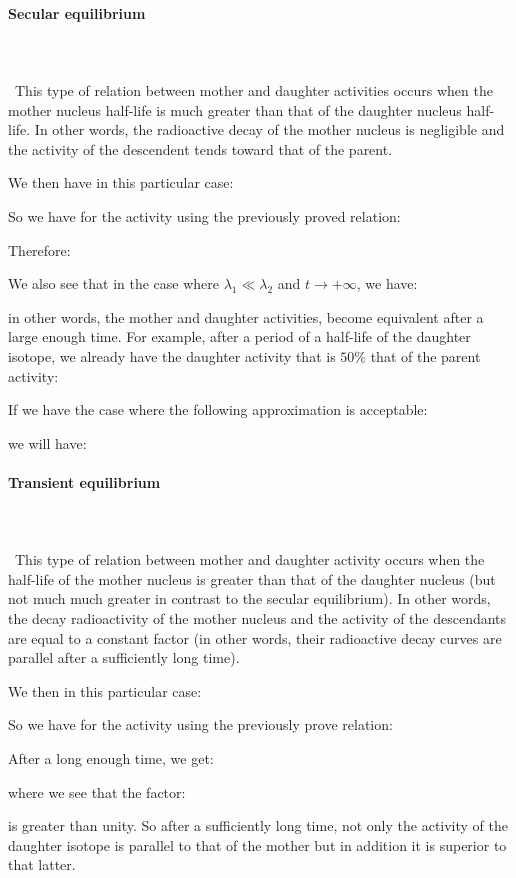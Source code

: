 	\paragraph{Secular equilibrium}\mbox{}\\\\\
	This type of relation between mother and daughter activities occurs when the mother nucleus half-life is much greater than that of the daughter nucleus half-life. In other words, the radioactive decay of the mother nucleus is negligible and the activity of the descendent tends toward that of the parent.

	We then have in this particular case:
	
	So we have for the activity using the previously proved relation:
	
	Therefore:
	
	We also see that in the case where $\lambda_1\ll\lambda_2$ and $t\rightarrow +\infty$, we have:
	
	in other words, the mother and daughter activities, become equivalent after a large enough time. For example, after a period of a half-life of the daughter isotope, we already have the daughter activity that is $50\%$ that of the parent activity:
	
	If we have the case where the following approximation is acceptable:
	
	we will have:
	
	
	\pagebreak
	\paragraph{Transient equilibrium}\mbox{}\\\\\
	This type of relation between mother and daughter activity occurs when the half-life of the mother nucleus is greater than that of the daughter nucleus (but not much much greater in contrast to the secular equilibrium). In other words, the decay radioactivity of the mother nucleus and the activity of the descendants are equal to a constant factor (in other words, their radioactive decay curves are parallel after a sufficiently long time).

	We then in this particular case:
	
	So we have for the activity using the previously prove relation:
	
	After a long enough time, we get:
	
	where we see that the factor:
	
	is greater than unity. So after a sufficiently long time, not only the activity of the daughter isotope is parallel to that of the mother but in addition it is superior to that latter.
	
